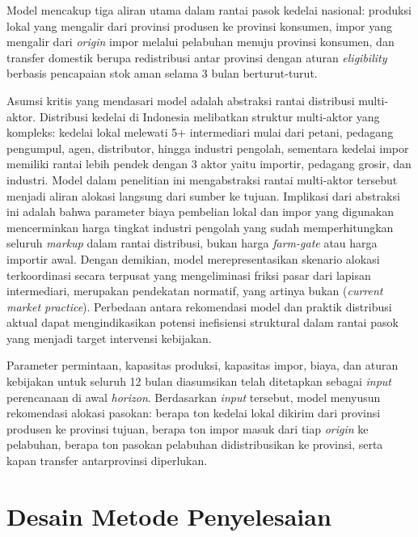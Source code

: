 \documentclass{file/TA-ITS}
\theoremstyle{definition}
\theoremstyle{definition}
\theoremstyle{plain}
\begin{document}
Model mencakup tiga aliran utama dalam rantai pasok kedelai nasional: produksi lokal yang mengalir dari provinsi produsen ke provinsi konsumen, impor yang mengalir dari \textit{origin} impor melalui pelabuhan menuju provinsi konsumen, dan transfer domestik berupa redistribusi antar provinsi dengan aturan \textit{eligibility} berbasis pencapaian stok aman selama 3 bulan berturut-turut.

Asumsi kritis yang mendasari model adalah abstraksi rantai distribusi multi-aktor. Distribusi kedelai di Indonesia melibatkan struktur multi-aktor yang kompleks: kedelai lokal melewati 5+ intermediari mulai dari petani, pedagang pengumpul, agen, distributor, hingga industri pengolah, sementara kedelai impor memiliki rantai lebih pendek dengan 3 aktor yaitu importir, pedagang grosir, dan industri. Model dalam penelitian ini mengabstraksi rantai multi-aktor tersebut menjadi aliran alokasi langsung dari sumber ke tujuan. Implikasi dari abstraksi ini adalah bahwa parameter biaya pembelian lokal dan impor yang digunakan mencerminkan harga tingkat industri pengolah yang sudah memperhitungkan seluruh \textit{markup} dalam rantai distribusi, bukan harga \textit{farm-gate} atau harga importir awal. Dengan demikian, model merepresentasikan skenario alokasi terkoordinasi secara terpusat yang mengeliminasi friksi pasar dari lapisan intermediari, merupakan pendekatan normatif, yang artinya bukan (\textit{current market practice}). Perbedaan antara rekomendasi model dan praktik distribusi aktual dapat mengindikasikan potensi inefisiensi struktural dalam rantai pasok yang menjadi target intervensi kebijakan.

Parameter permintaan, kapasitas produksi, kapasitas impor, biaya, dan aturan kebijakan untuk seluruh 12 bulan diasumsikan telah ditetapkan sebagai \textit{input} perencanaan di awal \textit{horizon}. Berdasarkan \textit{input} tersebut, model menyusun rekomendasi alokasi pasokan: berapa ton kedelai lokal dikirim dari provinsi produsen ke provinsi tujuan, berapa ton impor masuk dari tiap \textit{origin} ke pelabuhan, berapa ton pasokan pelabuhan didistribusikan ke provinsi, serta kapan transfer antarprovinsi diperlukan.

\section{Desain Metode Penyelesaian}
\end{document}
